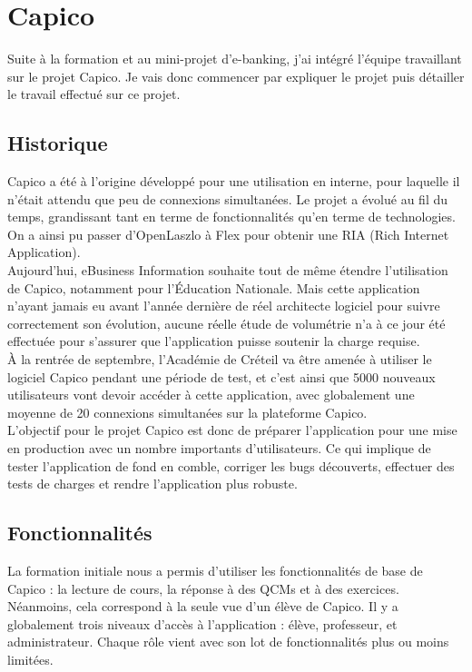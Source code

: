 \section{Capico}

Suite à la formation et au mini-projet d'e-banking, j'ai intégré l'équipe travaillant sur le projet Capico. Je vais donc commencer par expliquer le projet puis détailler le travail effectué sur ce projet.

\subsection{Historique}

Capico a été à l’origine développé pour une utilisation en interne, pour laquelle il n’était attendu que peu de connexions simultanées. Le projet a évolué au fil du temps, grandissant tant en terme de fonctionnalités qu’en terme de technologies. On a ainsi pu passer d’OpenLaszlo à Flex pour obtenir une RIA (Rich Internet Application).\\

Aujourd’hui, eBusiness Information souhaite tout de même étendre l’utilisation de Capico, notamment pour l’Éducation Nationale. Mais cette application n’ayant jamais eu avant l’année dernière de réel architecte logiciel pour suivre correctement son évolution, aucune réelle étude de volumétrie n’a à ce jour été effectuée pour s’assurer que l’application puisse soutenir la charge requise.\\

À la rentrée de septembre, l’Académie de Créteil va être amenée à utiliser le logiciel Capico pendant une période de test, et c’est ainsi que 5000 nouveaux utilisateurs vont devoir accéder à cette application, avec globalement une moyenne de 20 connexions simultanées sur la plateforme Capico.\\

L'objectif pour le projet Capico est donc de préparer l'application pour une mise en production avec un nombre importants d'utilisateurs. Ce qui implique de tester l'application de fond en comble, corriger les bugs découverts, effectuer des tests de charges et rendre l'application plus robuste.

\subsection{Fonctionnalités}

La formation initiale nous a permis d’utiliser les fonctionnalités de base de Capico : la lecture de cours, la réponse à des QCMs et à des exercices. Néanmoins, cela correspond à la seule vue d’un élève de Capico. Il y a globalement trois niveaux d’accès à l’application : élève, professeur, et administrateur. Chaque rôle vient avec son lot de fonctionnalités plus ou moins limitées.\\

